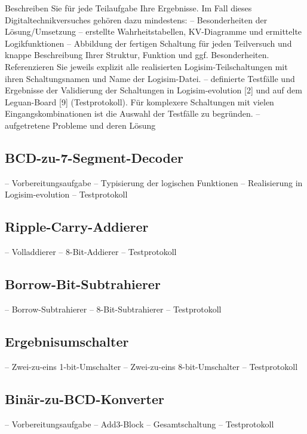 Beschreiben Sie für jede Teilaufgabe Ihre Ergebnisse. Im Fall dieses Digitaltechnikversuches gehören dazu mindestens:
–	Besonderheiten der Lösung/Umsetzung
–	erstellte Wahrheitstabellen, KV-Diagramme und ermittelte Logikfunktionen
–	Abbildung der fertigen Schaltung für jeden Teilversuch und knappe Beschreibung Ihrer Struktur, Funktion und ggf. Besonderheiten. Referenzieren Sie jeweils explizit alle realisierten Logisim-Teilschaltungen mit ihren Schaltungsnamen und Name der Logisim-Datei.
–	definierte Testfälle und Ergebnisse der Validierung der Schaltungen in Logisim-evolution [2] und auf dem Leguan-Board [9] (Testprotokoll). Für komplexere Schaltungen mit vielen Eingangskombinationen ist die Auswahl der Testfälle zu begründen.
–	aufgetretene Probleme und deren Lösung

\subsection{BCD-zu-7-Segment-Decoder}
–	Vorbereitungsaufgabe
–	Typisierung der logischen Funktionen
–	Realisierung in Logisim-evolution
–	Testprotokoll

\subsection{Ripple-Carry-Addierer}
–	Volladdierer
–	8-Bit-Addierer
–	Testprotokoll

\subsection{Borrow-Bit-Subtrahierer}
–	Borrow-Subtrahierer
–	8-Bit-Subtrahierer
–	Testprotokoll

\subsection{Ergebnisumschalter}
–	Zwei-zu-eins 1-bit-Umschalter
–	Zwei-zu-eins 8-bit-Umschalter
–	Testprotokoll

\subsection{Binär-zu-BCD-Konverter}
–	Vorbereitungsaufgabe
–	Add3-Block
–	Gesamtschaltung
–	Testprotokoll
